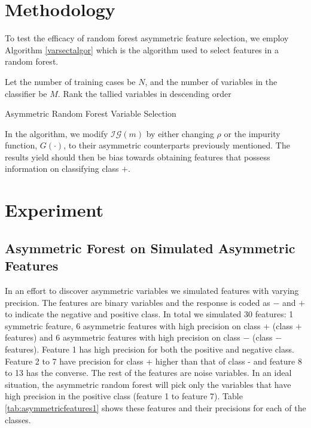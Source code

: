 \documentclass[twoside,11pt]{article}
\begin{document}
\section{Methodology}
To test the efficacy of random forest asymmetric feature selection, we employ Algorithm \ref{varsectalgor} which is the algorithm used to select features in a random forest. 
\begin{algorithm}\label{varsectalgor}
Let the number of training cases be $N$, and the number of variables in the classifier be $M$.
Rank the tallied variables in descending order 
\caption{Asymmetric Random Forest Variable Selection}\label{algo: AsymRandomForest}
\end{algorithm}
In the algorithm, we modify $\mathcal{IG}(m)$ by either changing $\rho$ or the impurity function, $G(\cdot)$, to their asymmetric counterparts previously mentioned. The results yield should then be bias towards obtaining features that possess information on classifying class $+$.

\section{Experiment}
\subsection{Asymmetric Forest on Simulated Asymmetric Features}
In an effort to discover asymmetric variables we simulated features with varying precision. The features are binary variables and the response is coded as $-$ and $+$ to indicate the negative and positive class. In total we simulated 30 features: 1 symmetric feature, 6 asymmetric features with high precision on class + (class $+$ features) and 6 asymmetric features with high precision on class $-$ (class $-$ features).  Feature 1 has high precision for both the positive and negative class. Feature 2 to 7 have precision for class + higher than that of class - and feature 8 to 13 has the converse. The rest of the features are noise variables. In an ideal situation, the asymmetric random forest will pick only the variables that have high precision in the positive class (feature 1 to feature 7). Table \ref{tab:asymmetricfeatures1} shows these features and their precisions for each of the classes.
\end{document}
